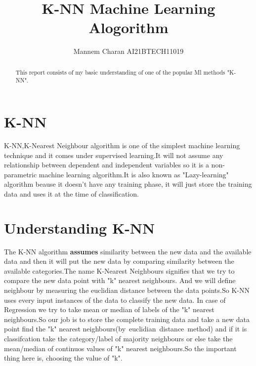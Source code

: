 \documentclass[journal,12pt,onecolumn]{IEEEtran}
\theoremstyle{remark}
\numberwithin{equation}{section}
\begin{document}
		\title{ K-NN Machine Learning Alogorithm}
		\author{ Mannem Charan AI21BTECH11019}
                \maketitle
		\begin{abstract}
			This report consists of my basic understanding of one of the popular Ml methods "K-NN".
		\end{abstract}
               \section{K-NN}
                 K-NN,K-Nearest Neighbour algorithm is one of the simplest machine learning technique and it comes under supervised learning.It will not assume any relationship between dependent and independent variables so it is a non-parametric machine learning algorithm.It is also known as "Lazy-learning" algorithm beause it doesn't have any training phase, it will just store the training data and uses it at the time of classification.
	       \section{Understanding K-NN}
	       The K-NN algorithm \textbf{assumes} similarity between the new data and the available data and then it will put the new data by comparing similarity between the available categories.The name K-Nearest Neighbours signifies that we try to compare the new data point with "k" nearest neighbours. And we will define neighbour by measuring the euclidian distance between the data points.So K-NN uses every input instances of the data to classify the new data. In case of Regression we try to take mean or median of labels of the "k" nearest neighbours.So our job is to store the complete training data and take a new data point find the "k" nearest neighbours(by\, euclidian\, distance\, method) and if it is classifcation take the category/label of majority neighbours or else take the mean/median of continuos values of "k" nearest neighbours.So the important thing here is, choosing the value of "k".
\end{document}
